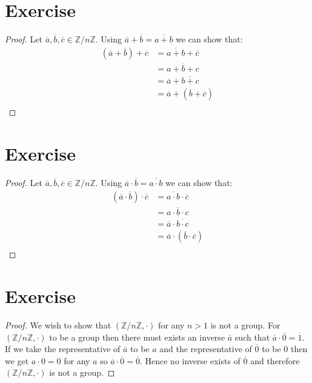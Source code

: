 \documentclass{article}
\begin{document}
\section{Exercise}
\begin{proof}
    Let $\overline{a}, \overline{b}, \overline{c} \in \mathbb{Z}/n\mathbb{Z}$.
    Using $\overline{a} + \overline{b} = \overline{a + b}$ we can show that:
    \begin{align*}
        (\overline{a} + \overline{b}) + \overline{c} &= \overline{a + b} + \overline{c} \\
        &= \overline{a + b + c} \\
        &= \overline{a} + \overline{b + c} \\
        &= \overline{a} + (\overline{b} + \overline{c}) \\
    \end{align*}
\end{proof}
\section{Exercise}
\begin{proof}
    Let $\overline{a}, \overline{b}, \overline{c} \in \mathbb{Z}/n\mathbb{Z}$.
    Using $\overline{a} \cdot \overline{b} = \overline{a \cdot b}$ we can show that:
    \begin{align*}
        (\overline{a} \cdot \overline{b}) \cdot \overline{c} &= \overline{a \cdot b} \cdot \overline{c} \\
        &= \overline{a \cdot b \cdot c} \\
        &= \overline{a} \cdot \overline{b \cdot c} \\
        &= \overline{a} \cdot (\overline{b} \cdot \overline{c}) \\
    \end{align*}
\end{proof}
\section{Exercise}
\begin{proof}
    We wish to show that $(\mathbb{Z}/n\mathbb{Z}, \cdot)$ for any $n > 1$ is
    not a group. For $(\mathbb{Z}/n\mathbb{Z}, \cdot)$ to be a group then there
    must exists an inverse $\overline{a}$ such that $\overline{a} \cdot
    \overline{0} = \overline{1}$. If we take the representative of
    $\overline{a}$ to be $a$ and the representative of $\overline{0}$ to be $0$
    then we get $a \cdot 0 = 0$ for any $a$ so $\overline{a} \cdot \overline{0}
    = \overline{0}$. Hence no inverse exists of $\overline{0}$ and therefore
    $(\mathbb{Z}/n\mathbb{Z}, \cdot)$ is not a group.
\end{proof}
\end{document}
